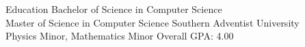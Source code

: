 \begin{rSection}{Education}
	Bachelor of Science in Computer Science \hfill {}\\
	Master of Science in Computer Science \hfill {Southern Adventist University}\\
	Physics Minor, Mathematics Minor \hfill {Overall GPA: 4.00}
\end{rSection}